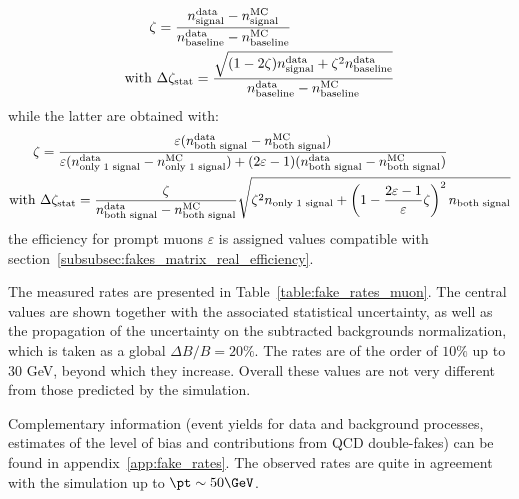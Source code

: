 \begin{align}
\zeta&=\frac{n_\text{signal}^\text{data} - n_\text{signal}^\text{MC}}{n_\text{baseline}^\text{data} - n_\text{baseline}^\text{MC}}\\
\text{with }&\Delta\zeta_\text{stat} = \frac{\sqrt{(1-2\zeta)n_\text{signal}^\text{data} + \zeta^2 n_\text{baseline}^\text{data}}}
{n_\text{baseline}^\text{data} - n_\text{baseline}^\text{MC}}\notag
\end{align}
while the latter are obtained with:
\begin{align}
\zeta &= \frac{\varepsilon (n_\text{both signal}^\text{data} - n_\text{both signal}^\text{MC})}
{\varepsilon (n_\text{only 1 signal}^\text{data} - n_\text{only 1 signal}^\text{MC})
+(2\varepsilon-1)(n_\text{both signal}^\text{data} - n_\text{both signal}^\text{MC})}\\
\text{with }&\Delta\zeta_\text{stat} 
= \frac{\zeta}{n_\text{both signal}^\text{data} - n_\text{both signal}^\text{MC}}
\sqrt{\zeta^2 n_\text{only 1 signal} + \left(1-\frac{2\varepsilon-1}{\varepsilon}\zeta\right)^2 n_\text{both signal}}\notag
\end{align}
the efficiency for prompt muons $\varepsilon$ is assigned values compatible with section~\ref{subsubsec:fakes_matrix_real_efficiency}. 

The measured rates are presented in Table~\ref{table:fake_rates_muon}. 
The central values are shown together with the associated statistical uncertainty, 
as well as the propagation of the uncertainty on the subtracted backgrounds normalization, 
which is taken as a global $\Delta B/B=20\%$. 
The rates are of the order of $10\%$ up to 30 GeV, beyond which they increase. 
Overall these values are not very different from those predicted by the simulation. 

Complementary information (event yields for data and background processes, estimates of the level of bias and contributions from QCD double-fakes) 
can be found in appendix~\ref{app:fake_rates}. 
The observed rates are quite in agreement with the simulation up to $\pt\sim 50\GeV$. 

